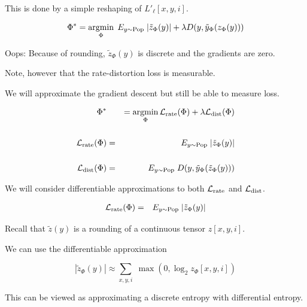 {\vfill
This is done by a simple reshaping of $L'_\ell[x,y,i]$.


$$\Phi^* = \operatorname*{argmin}_\Phi \;E_{y \sim \mathrm{Pop}}\;|\tilde{z}_\Phi(y)| + \lambda D(y,\tilde{y}_\Phi(z_\Phi(y)))$$

\vfill
Oops: Because of rounding, $\tilde{z}_\Phi(y)$ is discrete and the gradients are zero.

\vfill
Note, however that the rate-distortion loss is measurable.

\vfill
We will approximate the gradient descent but still be able to measure loss.


\begin{eqnarray*}
\Phi^* & & = \operatorname*{argmin}_\Phi {\cal L}_{\mathrm{rate}}(\Phi) + \lambda {\cal L}_{\mathrm{dist}} (\Phi) \\
\\
{\cal L}_{\mathrm{rate}}(\Phi) & = & E_{y \sim \mathrm{Pop}}\;|\tilde{z}_\Phi(y)| \\
\\
{\cal L}_{\mathrm{dist}}(\Phi) & = & E_{y \sim \mathrm{Pop}} \;D(y,\tilde{y}_\Phi(\tilde{z}_\Phi(y)))
\end{eqnarray*}

\vfill
We will consider differentiable approximations to both ${\cal L}_{\mathrm{rate}}$ and ${\cal L}_{\mathrm{dist}}$.


\begin{eqnarray*}
{\cal L}_{\mathrm{rate}}(\Phi) & = & E_{y \sim \mathrm{Pop}}\;|\tilde{z}_\Phi(y)| 
\end{eqnarray*}

\vfill
Recall that $\tilde{z}(y)$ is a rounding of a continuous tensor $z[x,y,i]$.

\vfill
We can use the differentiable approximation

\vfill
$$|\tilde{z}_\Phi(y)| \approx \sum_{x,y,i} \; \max(0,\log_2 z_\Phi[x,y,i])$$

\vfill
This can be viewed as approximating a discrete entropy with differential entropy.


}
